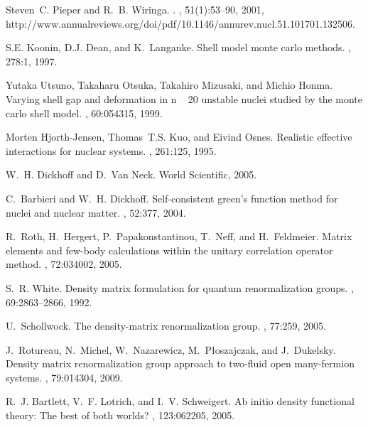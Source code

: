 \begin{thebibliography}{200}
Steven~C. Pieper and R.~B. Wiringa.
.
, 51(1):53--90,
  2001,
  http://www.annualreviews.org/doi/pdf/10.1146/annurev.nucl.51.101701.132506.

S.E. Koonin, D.J. Dean, and K.~Langanke.
\newblock Shell model monte carlo methods.
, 278:1, 1997.

Yutaka Utsuno, Takaharu Otsuka, Takahiro Mizusaki, and Michio Honma.
\newblock Varying shell gap and deformation in n ~ 20 unstable nuclei studied
  by the monte carlo shell model.
, 60:054315, 1999.

Morten Hjorth-Jensen, Thomas~T.S. Kuo, and Eivind Osnes.
\newblock Realistic effective interactions for nuclear systems.
, 261:125, 1995.

W.~H. Dickhoff and D.~Van Neck.
\newblock World Scientific, 2005.

C.~Barbieri and W.~H. Dickhoff.
\newblock Self-consistent green's function method for nuclei and nuclear
  matter.
, 52:377, 2004.

R.~Roth, H.~Hergert, P.~Papakonstantinou, T.~Neff, and H.~Feldmeier.
\newblock Matrix elements and few-body calculations within the unitary
  correlation operator method.
, 72:034002, 2005.

S.~R. White.
\newblock Density matrix formulation for quantum renormalization groups.
, 69:2863--2866, 1992.

U.~Schollwock.
\newblock The density-matrix renormalization group.
, 77:259, 2005.

J.~Rotureau, N.~Michel, W.~Nazarewicz, M.~P\l{}oszajczak, and J.~Dukelsky.
\newblock Density matrix renormalization group approach to two-fluid open
  many-fermion systems.
, 79:014304, 2009.

R.~J. Bartlett, V.~F. Lotrich, and I.~V. Schweigert.
\newblock Ab initio density functional theory: The best of both worlds?
, 123:062205, 2005.


\end{thebibliography}
